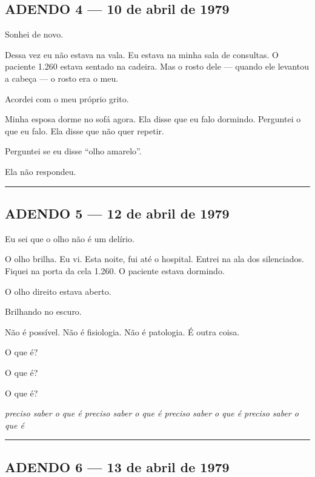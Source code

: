 \subsection*{ADENDO 4 --- 10 de abril de 1979}

\noindent Sonhei de novo.

\noindent Dessa vez eu não estava na vala. Eu estava na minha sala de consultas. O paciente 1.260 estava sentado na cadeira. Mas o rosto dele --- quando ele levantou a cabeça --- o rosto era o meu.

\noindent Acordei com o meu próprio grito.

\noindent Minha esposa dorme no sofá agora. Ela disse que eu falo dormindo. Perguntei o que eu falo. Ela disse que não quer repetir.

\noindent Perguntei se eu disse \textquotedblleft{}olho amarelo\textquotedblright{}.

\noindent Ela não respondeu.

\vspace{0.5em}\noindent\rule{\textwidth}{0.5pt}\vspace{0.5em}

\subsection*{ADENDO 5 --- 12 de abril de 1979}

\noindent Eu sei que o olho não é um delírio.

\noindent O olho brilha. Eu vi. Esta noite, fui até o hospital. Entrei na ala dos silenciados. Fiquei na porta da cela 1.260. O paciente estava dormindo.

\noindent O olho direito estava aberto.

\noindent Brilhando no escuro.

\noindent Não é possível. Não é fisiologia. Não é patologia. É outra coisa.

\noindent O que é?

\noindent O que é?

\noindent O que é?

\noindent \textit{preciso saber o que é preciso saber o que é preciso saber o que é preciso saber o que é}

\vspace{0.5em}\noindent\rule{\textwidth}{0.5pt}\vspace{0.5em}

\subsection*{ADENDO 6 --- 13 de abril de 1979}

